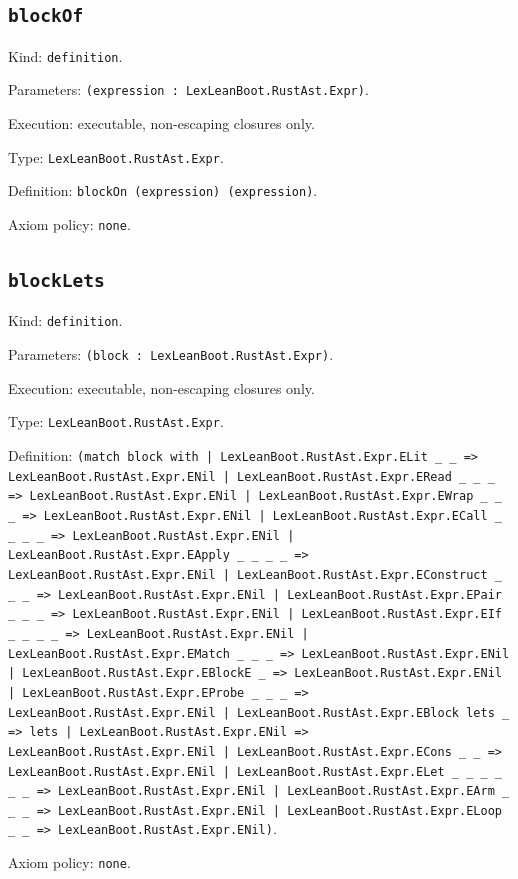 \documentclass[11pt]{article}
\begin{document}
\subsection*{\texttt{blockOf}}
\noindent Kind: \texttt{definition}.\par
\noindent Parameters: \texttt{(expression : LexLeanBoot.RustAst.Expr)}.\par
\noindent Execution: executable, non-escaping closures only.\par
\noindent Type: \texttt{LexLeanBoot.RustAst.Expr}.\par
\noindent Definition: \texttt{blockOn (expression) (expression)}.\par
\noindent Axiom policy: \texttt{none}.\par
\subsection*{\texttt{blockLets}}
\noindent Kind: \texttt{definition}.\par
\noindent Parameters: \texttt{(block : LexLeanBoot.RustAst.Expr)}.\par
\noindent Execution: executable, non-escaping closures only.\par
\noindent Type: \texttt{LexLeanBoot.RustAst.Expr}.\par
\noindent Definition: \texttt{(match block with | LexLeanBoot.RustAst.Expr.ELit \_ \_ => LexLeanBoot.RustAst.Expr.ENil | LexLeanBoot.RustAst.Expr.ERead \_ \_ \_ => LexLeanBoot.RustAst.Expr.ENil | LexLeanBoot.RustAst.Expr.EWrap \_ \_ \_ => LexLeanBoot.RustAst.Expr.ENil | LexLeanBoot.RustAst.Expr.ECall \_ \_ \_ \_ => LexLeanBoot.RustAst.Expr.ENil | LexLeanBoot.RustAst.Expr.EApply \_ \_ \_ \_ => LexLeanBoot.RustAst.Expr.ENil | LexLeanBoot.RustAst.Expr.EConstruct \_ \_ \_ => LexLeanBoot.RustAst.Expr.ENil | LexLeanBoot.RustAst.Expr.EPair \_ \_ \_ => LexLeanBoot.RustAst.Expr.ENil | LexLeanBoot.RustAst.Expr.EIf \_ \_ \_ \_ => LexLeanBoot.RustAst.Expr.ENil | LexLeanBoot.RustAst.Expr.EMatch \_ \_ \_ => LexLeanBoot.RustAst.Expr.ENil | LexLeanBoot.RustAst.Expr.EBlockE \_ => LexLeanBoot.RustAst.Expr.ENil | LexLeanBoot.RustAst.Expr.EProbe \_ \_ \_ => LexLeanBoot.RustAst.Expr.ENil | LexLeanBoot.RustAst.Expr.EBlock lets \_ => lets | LexLeanBoot.RustAst.Expr.ENil => LexLeanBoot.RustAst.Expr.ENil | LexLeanBoot.RustAst.Expr.ECons \_ \_ => LexLeanBoot.RustAst.Expr.ENil | LexLeanBoot.RustAst.Expr.ELet \_ \_ \_ \_ \_ \_ => LexLeanBoot.RustAst.Expr.ENil | LexLeanBoot.RustAst.Expr.EArm \_ \_ \_ => LexLeanBoot.RustAst.Expr.ENil | LexLeanBoot.RustAst.Expr.ELoop \_ \_ => LexLeanBoot.RustAst.Expr.ENil)}.\par
\noindent Axiom policy: \texttt{none}.\par
\end{document}
